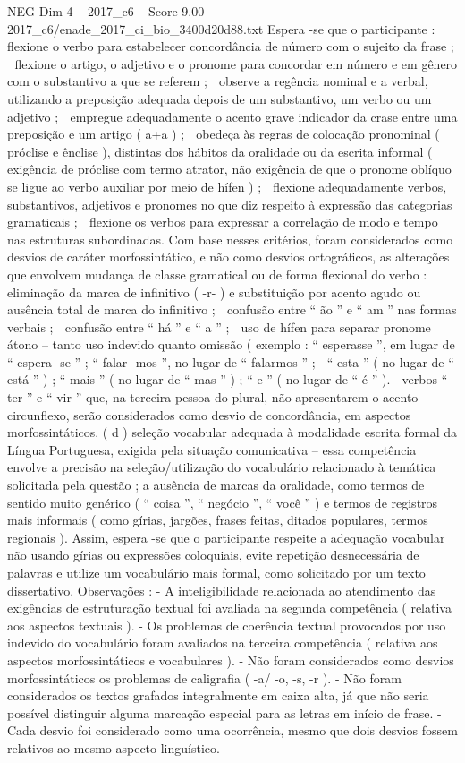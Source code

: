 \begin{textsample}{NEG Dim 4 – 2017\_c6 – Score 9.00 – 2017\_c6/enade\_2017\_ci\_bio\_3400d20d88.txt}
Espera -se que o participante :  flexione o verbo para estabelecer concordância de número com o sujeito da frase ;  flexione o artigo, o adjetivo e o pronome para concordar em número e em gênero com o substantivo a que se referem ;  observe a regência nominal e a verbal, utilizando a preposição adequada depois de um substantivo, um verbo ou um adjetivo ;  empregue adequadamente o acento grave indicador da crase entre uma preposição e um artigo ( a+a ) ;  obedeça às regras de colocação pronominal ( próclise e ênclise ), distintas dos hábitos da oralidade ou da escrita informal ( exigência de próclise com termo atrator, não exigência de que o pronome oblíquo se ligue ao verbo auxiliar por meio de hífen ) ;  flexione adequadamente verbos, substantivos, adjetivos e pronomes no que diz respeito à expressão das categorias gramaticais ;  flexione os verbos para expressar a correlação de modo e tempo nas estruturas subordinadas.
Com base nesses critérios, foram considerados como desvios de caráter morfossintático, e não como desvios ortográficos, as alterações que envolvem mudança de classe gramatical ou de forma flexional do verbo :  eliminação da marca de infinitivo ( -r- ) e substituição por acento agudo ou ausência total de marca do infinitivo ;  confusão entre “ ão ” e “ am ” nas formas verbais ;  confusão entre “ há ” e “ a ” ;  uso de hífen para separar pronome átono – tanto uso indevido quanto omissão ( exemplo : “ esperasse ”, em lugar de “ espera -se ” ; “ falar -mos ”, no lugar de “ falarmos ” ;  “ esta ” ( no lugar de “ está ” ) ; “ mais ” ( no lugar de “ mas ” ) ; “ e ” ( no lugar de “ é ” ).  verbos “ ter ” e “ vir ” que, na terceira pessoa do plural, não apresentarem o acento circunflexo, serão considerados como desvio de concordância, em aspectos morfossintáticos. ( d ) seleção vocabular adequada à modalidade escrita formal da Língua Portuguesa, exigida pela situação comunicativa – essa competência envolve a precisão na seleção/utilização do vocabulário relacionado à temática solicitada pela questão ; a ausência de marcas da oralidade, como termos de sentido muito genérico ( “ coisa ”, “ negócio ”, “ você ” ) e termos de registros mais informais ( como gírias, jargões, frases feitas, ditados populares, termos regionais ).
Assim, espera -se que o participante respeite a adequação vocabular não usando gírias ou expressões coloquiais, evite repetição desnecessária de palavras e utilize um vocabulário mais formal, como solicitado por um texto dissertativo.
Observações : - A inteligibilidade relacionada ao atendimento das exigências de estruturação textual foi avaliada na segunda competência ( relativa aos aspectos textuais ). - Os problemas de coerência textual provocados por uso indevido do vocabulário foram avaliados na terceira competência ( relativa aos aspectos morfossintáticos e vocabulares ). - Não foram considerados como desvios morfossintáticos os problemas de caligrafia ( -a/ -o, -s, -r ). - Não foram considerados os textos grafados integralmente em caixa alta, já que não seria possível distinguir alguma marcação especial para as letras em início de frase. - Cada desvio foi considerado como uma ocorrência, mesmo que dois desvios fossem relativos ao mesmo aspecto linguístico.

\end{textsample}
